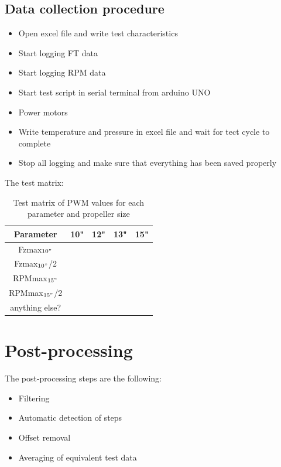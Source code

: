 \documentclass[a4paper]{article}
\begin{document}
{\subsection{Data collection procedure}

\begin{itemize}
	\item Open excel file and write test characteristics
	\item Start logging FT data
	\item Start logging RPM data
	\item Start test script in serial terminal from arduino UNO
	\item Power motors
	\item Write temperature and pressure in excel file and wait for tect cycle to complete
	\item Stop all logging and make sure that everything has been saved properly
\end{itemize}

The test matrix:

\begin{table}[h!]
	\centering
	\caption{Test matrix of PWM values for each parameter and propeller size \label{tab:testMat}}
	\begin{tabular}{||c | c | c | c | c ||} 
		\hline
		Parameter & 10" & 12" & 13" & 15"\\ [0.5ex] 
		\hline
		Fzmax$_{10"}$ & & & &  \\ 
		\hline
		Fzmax$_{10"}$/2 & & & &  \\
		\hline
		RPMmax$_{15"}$ & & & &  \\
		\hline
		RPMmax$_{15"}$/2 & & & &  \\
		\hline
		anything else? & & & &  \\
		\hline
	\end{tabular}
\end{table}

\section{Post-processing}

The post-processing steps are the following:

\begin{itemize}
	\item Filtering
	\item Automatic detection of steps
	\item Offset removal
	\item Averaging of equivalent test data
	

\end{itemize}}
\end{document}
